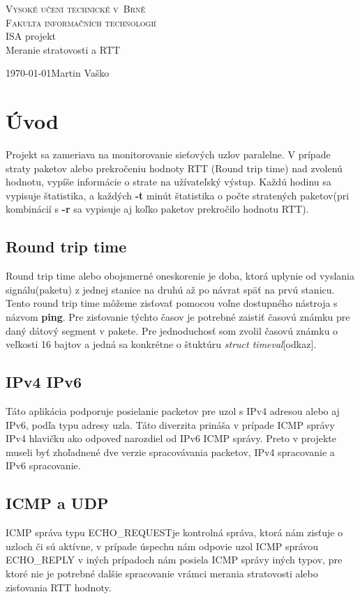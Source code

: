 \documentclass[11pt,a4paper]{report}
\author{Martin Vaško}
\begin{document}
\begin{titlepage}
\begin{center}
{\Huge\textsc{Vysoké učení technické v~Brně\\\huge{Fakulta informačních technologií\\}}}
\LARGE
ISA projekt\\
\Huge{Meranie stratovosti a RTT}
\end{center}
{\Large \today \hfill Martin Vaško}
\end{titlepage}
\tableofcontents

\chapter{Úvod}
Projekt sa zameriava na monitorovanie sieťových uzlov paralelne. V prípade straty paketov alebo prekročeniu hodnoty RTT (Round trip time) nad zvolenú hodnotu, vypíše informácie o strate na užívateľský výstup. Každú hodinu sa vypisuje štatistika, a každých \textbf{-t}\pageref{param} minút štatistika o počte stratených paketov(pri kombinácií s \textbf{-r} sa vypisuje aj koľko paketov prekročilo hodnotu RTT).

\section{Round trip time}
Round trip time alebo obojsmerné oneskorenie je doba, ktorá uplynie od vyslania signálu(paketu) z jednej stanice na druhú až po návrat späť na prvú stanicu. Tento round trip time môžeme zisťovať pomocou voľne dostupného nástroja s názvom \textbf{ping}. Pre zisťovanie týchto časov je potrebné zaistiť časovú známku pre daný dátový segment v pakete. Pre jednoduchosť som zvolil časovú známku o veľkosti 16 bajtov a jedná sa konkrétne o štuktúru \emph{struct timeval}[odkaz].

\section{IPv4 IPv6}
Táto aplikácia podporuje posielanie packetov pre uzol s IPv4 adresou alebo aj IPv6, podľa typu adresy uzla. Táto diverzita prináša v prípade ICMP správy IPv4 hlavičku ako odpoveď narozdiel od IPv6 ICMP správy. Preto v projekte museli byť zhoľadnené dve verzie spracovávania packetov, IPv4 spracovanie a IPv6 spracovanie.
\section{ICMP a UDP}
ICMP správa typu ECHO\_REQUEST\footnotemark je kontrolná správa, ktorá nám zisťuje o uzloch či sú aktívne, v prípade úspechu nám odpovie uzol ICMP správou ECHO\_REPLY v iných prípadoch nám posiela ICMP správy iných typov, pre ktoré nie je potrebné dalšie spracovanie vrámci merania stratovosti alebo zisťovania RTT hodnoty.
\end{document}
